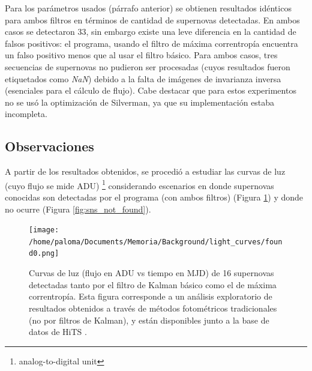 Para los par\'ametros usados (p\'arrafo anterior) se obtienen resultados id\'enticos para ambos filtros en t\'erminos de cantidad de supernovas detectadas. En ambos casos se detectaron 33, sin embargo existe una leve diferencia en la cantidad de falsos positivos: el programa, usando el filtro de m\'axima correntrop\'ia encuentra un falso positivo menos que al usar el filtro b\'asico. Para ambos casos, tres secuencias de supernovas no pudieron ser procesadas (cuyos resultados fueron etiquetados como \textit{NaN}) debido a la falta de im\'agenes de invarianza inversa (esenciales para el c\'alculo de flujo). Cabe destacar que para estos experimentos no se us\'o la optimizaci\'on de Silverman, ya que su implementaci\'on estaba incompleta.  %
\bigskip


\subsection{Observaciones}
A partir de los resultados obtenidos, se procedi\'o a estudiar las curvas de luz (cuyo flujo se mide ADU) \footnote{analog-to-digital unit} considerando escenarios en donde supernovas conocidas son detectadas por el programa (con ambos filtros) (Figura \ref{fig:sns_found}) y donde no ocurre (Figura \ref{fig:sns_not_found}). 

\begin{figure}[h!]
\centering
\texttt{[image: /home/paloma/Documents/Memoria/Background/light\_curves/found0.png]}
\caption{Curvas de luz (flujo en ADU vs tiempo en MJD) de 16 supernovas detectadas tanto por el filtro de Kalman b\'asico como el de m\'axima correntrop\'ia. Esta figura corresponde a un an\'alisis exploratorio de resultados obtenidos a trav\'es de m\'etodos fotom\'etricos tradicionales (no por filtros de Kalman), y est\'an disponibles junto a la base de datos de HiTS \cite{hits}.}
\label{fig:sns_found}
\end{figure}

